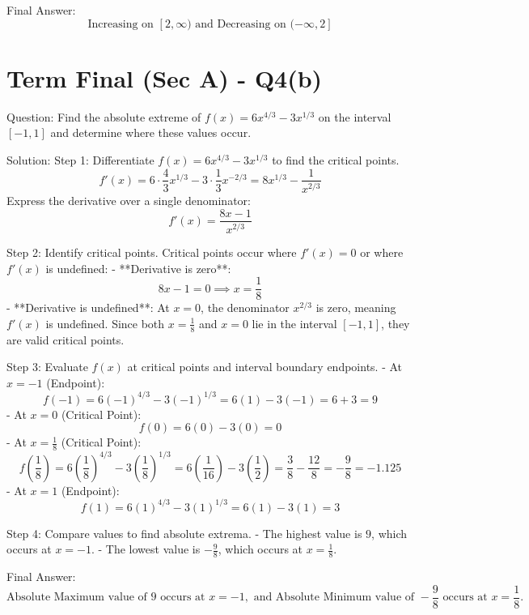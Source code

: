 \documentclass{article}
\begin{document}
Final Answer:
\[
\boxed{\text{Increasing on } [2, \infty) \text{ and Decreasing on } (-\infty, 2]}
\]

\section*{Term Final (Sec A) - Q4(b)}
Question:
Find the absolute extreme of $f(x) = 6x^{4/3} - 3x^{1/3}$ on the interval $[-1,1]$ and determine where these values occur.

Solution:
Step 1: Differentiate $f(x) = 6x^{4/3} - 3x^{1/3}$ to find the critical points.
\[
f'(x) = 6 \cdot \frac{4}{3} x^{1/3} - 3 \cdot \frac{1}{3} x^{-2/3} = 8x^{1/3} - \frac{1}{x^{2/3}}
\]
Express the derivative over a single denominator:
\[
f'(x) = \frac{8x - 1}{x^{2/3}}
\]

Step 2: Identify critical points.
Critical points occur where $f'(x) = 0$ or where $f'(x)$ is undefined:
- **Derivative is zero**:
  \[
  8x - 1 = 0 \implies x = \frac{1}{8}
  \]
- **Derivative is undefined**:
  At $x = 0$, the denominator $x^{2/3}$ is zero, meaning $f'(x)$ is undefined.
Since both $x = \frac{1}{8}$ and $x = 0$ lie in the interval $[-1, 1]$, they are valid critical points.

Step 3: Evaluate $f(x)$ at critical points and interval boundary endpoints.
- At $x = -1$ (Endpoint):
  \[
  f(-1) = 6(-1)^{4/3} - 3(-1)^{1/3} = 6(1) - 3(-1) = 6 + 3 = 9
  \]
- At $x = 0$ (Critical Point):
  \[
  f(0) = 6(0) - 3(0) = 0
  \]
- At $x = \frac{1}{8}$ (Critical Point):
  \[
  f\left(\frac{1}{8}\right) = 6\left(\frac{1}{8}\right)^{4/3} - 3\left(\frac{1}{8}\right)^{1/3} = 6 \left(\frac{1}{16}\right) - 3 \left(\frac{1}{2}\right) = \frac{3}{8} - \frac{12}{8} = -\frac{9}{8} = -1.125
  \]
- At $x = 1$ (Endpoint):
  \[
  f(1) = 6(1)^{4/3} - 3(1)^{1/3} = 6(1) - 3(1) = 3
  \]

Step 4: Compare values to find absolute extrema.
- The highest value is $9$, which occurs at $x = -1$.
- The lowest value is $-\frac{9}{8}$, which occurs at $x = \frac{1}{8}$.

Final Answer:
\[
\boxed{\text{Absolute Maximum value of } 9 \text{ occurs at } x = -1, \text{ and Absolute Minimum value of } -\frac{9}{8} \text{ occurs at } x = \frac{1}{8}.}
\]
\end{document}
